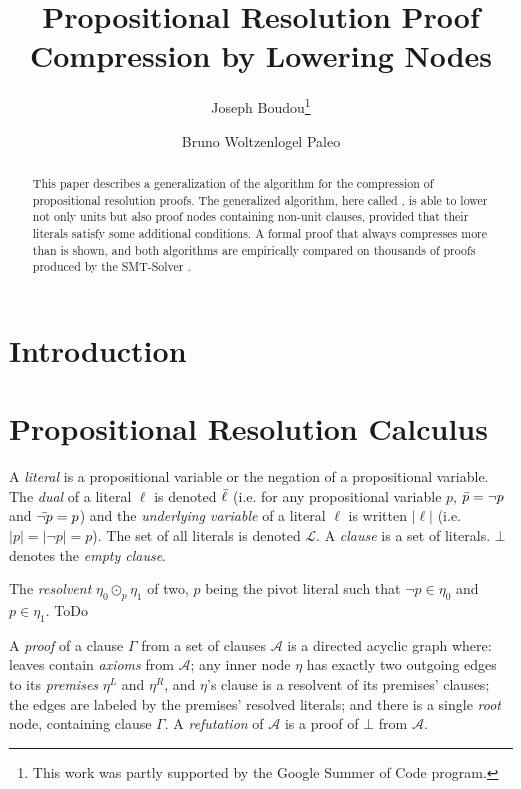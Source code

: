 \documentclass{llncs}
\title{Propositional Resolution Proof Compression by Lowering Nodes}
\author{
  Joseph Boudou\inst{1}\thanks{This work was partly supported by the Google Summer of Code program.}
  \and 
  Bruno Woltzenlogel Paleo\inst{2}
}
\institute{
  Universit\'e Paul Sabatier, Toulouse \\
  \email{joseph.boudou@matabio.net}
  \and 
  Vienna University of Technology \\
  \email{bruno@logic.at}
}
\begin{document}
\maketitle


\begin{abstract}
This paper describes a generalization of the {\LowerUnits} algorithm \cite{LURPI} for the compression
of propositional resolution proofs. The generalized algorithm, here called {\LowerUnivalents}, is
able to lower not only units but also proof nodes containing non-unit clauses, provided that their
literals satisfy some additional conditions. A formal proof that {\LowerUnivalents} always
compresses more than {\LowerUnits} is shown, and both algorithms are empirically compared on
thousands of proofs produced by the SMT-Solver \veriT.
\end{abstract}

\section{Introduction}


\section{Propositional Resolution Calculus}

A \emph{literal} is a propositional variable or the negation of a propositional variable. The \emph{dual} of a literal $\ell$ is denoted
$\bar{\ell}$ (i.e. for any propositional variable $p$, $\bar{p} =
\neg p$ and $\bar{\neg p} = p$) and the \emph{underlying variable} of a literal
$\ell$ is written $|\ell|$ (i.e. $|p| = |\neg p| = p$). The set of all literals is denoted $\mathcal{L}$. A \emph{clause} is a set of literals. $\bot$ denotes the \emph{empty clause}.


\begin{notation}[Resolvent]
The \emph{resolvent} $\eta_0 \odot_p \eta_1$ of two, $p$ being the pivot
literal such that $\neg p \in \eta_0$ and $p \in \eta_1$. ToDo
\end{notation}

\noindent
A \emph{proof} of a clause $\Gamma$ from a set of clauses $\mathcal{A}$ is a
directed acyclic graph where: leaves contain \emph{axioms} from $\mathcal{A}$;
any inner node $\eta$ has exactly two outgoing edges to its \emph{premises} $\eta^L$ and $\eta^R$, and $\eta$'s clause is a resolvent of its premises' clauses; the edges are labeled by the premises'
resolved literals; and there is a single \emph{root} node, containing clause $\Gamma$. A \emph{refutation} of $\mathcal{A}$ is a proof of $\bot$ from $\mathcal{A}$.
\end{document}
